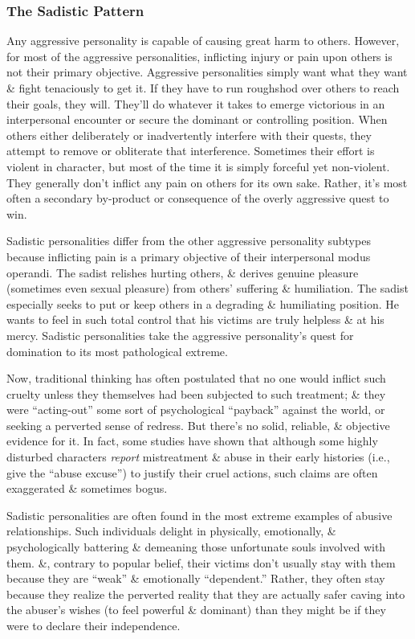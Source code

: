 \documentclass{article}
\numberwithin{equation}{section}
\begin{document}
\subsubsection{The Sadistic Pattern}
Any aggressive personality is capable of causing great harm to others. However, for most of the aggressive personalities, inflicting injury or pain upon others is not their primary objective. Aggressive personalities simply want what they want \& fight tenaciously to get it. If they have to run roughshod over others to reach their goals, they will. They'll do whatever it takes to emerge victorious in an interpersonal encounter or secure the dominant or controlling position. When others either deliberately or inadvertently interfere with their quests, they attempt to remove or obliterate that interference. Sometimes their effort is violent in character, but most of the time it is simply forceful yet non-violent. They generally don't inflict any pain on others for its own sake. Rather, it's most often a secondary by-product or consequence of the overly aggressive quest to win.

Sadistic personalities differ from the other aggressive personality subtypes because inflicting pain is a primary objective of their interpersonal modus operandi. The sadist relishes hurting others, \& derives genuine pleasure (sometimes even sexual pleasure) from others' suffering \& humiliation. The sadist especially seeks to put or keep others in a degrading \& humiliating position. He wants to feel in such total control that his victims are truly helpless \& at his mercy. Sadistic personalities take the aggressive personality's quest for domination to its most pathological extreme.

Now, traditional thinking has often postulated that no one would inflict such cruelty unless they themselves had been subjected to such treatment; \& they were ``acting-out'' some sort of psychological ``payback'' against the world, or seeking a perverted sense of redress. But there's no solid, reliable, \& objective evidence for it. In fact, some studies have shown that although some highly disturbed characters \textit{report} mistreatment \& abuse in their early histories (i.e., give the ``abuse excuse'') to justify their cruel actions, such claims are often exaggerated \& sometimes bogus.

Sadistic personalities are often found in the most extreme examples of abusive relationships. Such individuals delight in physically, emotionally, \& psychologically battering \& demeaning those unfortunate souls involved with them. \&, contrary to popular belief, their victims don't usually stay with them because they are ``weak'' \& emotionally ``dependent.'' Rather, they often stay because they realize the perverted reality that they are actually safer caving into the abuser's wishes (to feel powerful \& dominant) than they might be if they were to declare their independence.
\end{document}
